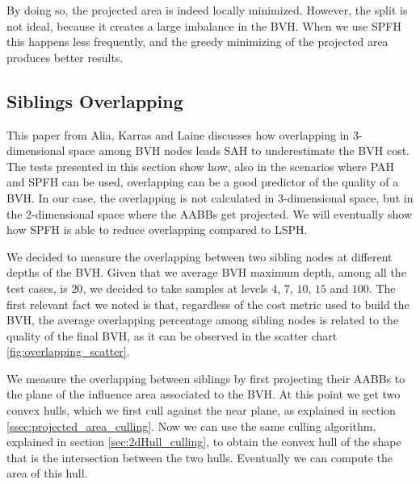 \documentclass{PoliMi_MasterThesis}
\begin{document}
By doing so, the projected area is indeed locally minimized. However, the split is not ideal, because it creates a large imbalance in the BVH. When we use SPFH this happens less frequently, and the greedy minimizing of the projected area produces better results.

\subsection{Siblings Overlapping} \label{ssec:siblings_overlapping}
This paper \cite{bvh_overlapping_metric} from Alia, Karras and Laine discusses how overlapping in 3-dimensional space among BVH nodes leads SAH to underestimate the BVH cost. The tests presented in this section show how, also in the scenarios where PAH and SPFH can be used, overlapping can be a good predictor of the quality of a BVH. In our case, the overlapping is not calculated in 3-dimensional space, but in the 2-dimensional space where the AABBs get projected. We will eventually show how SPFH is able to reduce overlapping compared to LSPH.

We decided to measure the overlapping between two sibling nodes at different depths of the BVH. Given that we average BVH maximum depth, among all the test cases, is $20$, we decided to take samples at levels $4$, $7$, $10$, $15$ and $100$. The first relevant fact we noted is that, regardless of the cost metric used to build the BVH, the average overlapping percentage among sibling nodes is related to the quality of the final BVH, as it can be observed in the scatter chart \ref{fig:overlapping_scatter}.

We measure the overlapping between siblings by first projecting their AABBs to the plane of the influence area associated to the BVH. At this point we get two convex hulls, which we first cull against the near plane, as explained in section \ref{ssec:projected_area_culling}. Now we can use the same culling algorithm, explained in section \ref{sec:2dHull_culling}, to obtain the convex hull of the shape that is the intersection between the two hulls. Eventually we can compute the area of this hull. 
\end{document}

